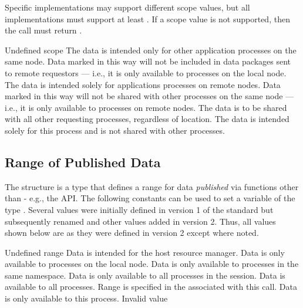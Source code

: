 Specific implementations may support different scope values, but all implementations must support at least .
If a scope value is not supported, then the  call must return .

\begin{constantdesc}
%
Undefined scope
%
The data is intended only for other application processes on the same node.
Data marked in this way will not be included in data packages sent to remote requestors --- i.e., it is only available to processes on the local node.
%
The data is intended solely for applications processes on remote nodes.
Data marked in this way will not be shared with other processes on the same node --- i.e., it is only available to  processes on remote nodes.
%
The data is to be shared with all other requesting processes, regardless of location.
%
The data is intended solely for this process and is not shared with other processes.
%
\end{constantdesc}



\subsection{Range of Published Data}

The  structure is a  type that defines a range for data \textit{published} via functions other than  - e.g., the  \ac{API}.
The following constants can be used to set a variable of the type . Several values were initially defined in version 1 of the standard but subsequently renamed and other values added in version 2. Thus, all values shown below are as they were defined in version 2 except where noted.

\begin{constantdesc}
%
Undefined range
%
Data is intended for the host resource manager.
%
Data is only available to processes on the local node.
%
Data is only available to processes in the same namespace.
%
Data is only available to all processes in the session.
%
Data is available to all processes.
%
Range is specified in the  associated with this call.
%
Data is only available to this process.
%
Invalid value
%
\end{constantdesc}

